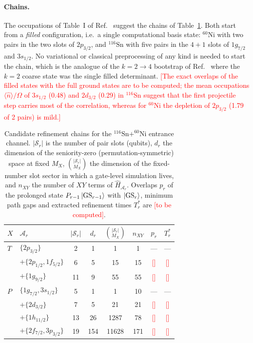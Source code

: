 \documentclass[
  aps,
  prc,
  reprint,
  superscriptaddress,
  floatfix,
  nofootinbib
]{revtex4-2}
\newcommand{\todo}[1]{\textcolor{red}{[#1]}}
\newcommand{\Sn}{^{116}\mathrm{Sn}}
\newcommand{\Ni}{^{60}\mathrm{Ni}}
\begin{document}
\paragraph{Chains.}
The occupations of Table~I of Ref.~\cite{TwoFragment2026} suggest the chains
of Table~\ref{tab:chains}.  Both start from a \emph{filled} configuration,
i.e.\ a single computational basis state: $\Ni$ with two pairs in the two
slots of $2p_{3/2}$, and $\Sn$ with five pairs in the $4+1$ slots of
$1g_{7/2}$ and $3s_{1/2}$.  No variational or classical preprocessing of any
kind is needed to start the chain, which is the analogue of the
$k=2\to4$ bootstrap of Ref.~\cite{EigenQPairing2026} where the $k=2$ coarse
state was the single filled determinant.  \todo{The exact overlaps of the
filled states with the full ground states are to be computed; the mean
occupations $\langle\hat n\rangle/\Omega$ of $3s_{1/2}$ (0.48) and
$2d_{3/2}$ (0.29) in $\Sn$ suggest that the first projectile step carries
most of the correlation, whereas for $\Ni$ the depletion of $2p_{3/2}$
(1.79 of 2 pairs) is mild.}

\begin{table}[t]
  \caption{Candidate refinement chains for the $\Sn+\Ni$ entrance channel.
  $|\mathcal S_r|$ is the number of pair slots (qubits), $d_r$ the dimension
  of the seniority-zero (permutation-symmetric) space at fixed $M_X$,
  $\binom{|\mathcal S_r|}{M_X}$ the dimension of the fixed-number slot
  sector in which a gate-level simulation lives, and $n_{XY}$ the number of
  $XY$ terms of $\hat H_{\mathcal A_r}$.  Overlaps $p_r$ of the prolonged
  state $P_{r-1}\ket{\mathrm{GS}_{r-1}}$ with $\ket{\mathrm{GS}_r}$, minimum
  path gaps and extracted refinement times $T^*_r$ are \todo{to be
  computed}.}
  \label{tab:chains}
  \begin{ruledtabular}
  \begin{tabular}{llcccccc}
  $X$ & $\mathcal A_r$ & $|\mathcal S_r|$ & $d_r$ & $\binom{|\mathcal S_r|}{M_X}$ & $n_{XY}$ & $p_r$ & $T^*_r$\\
  \hline
  $T$ & $\{2p_{3/2}\}$                      & 2  & 1   & 1     & 1   & --- & --- \\
      & $+\{2p_{1/2},1f_{5/2}\}$            & 6  & 5   & 15    & 15  & \todo{} & \todo{} \\
      & $+\{1g_{9/2}\}$                     & 11 & 9   & 55    & 55  & \todo{} & \todo{} \\
  \hline
  $P$ & $\{1g_{7/2},3s_{1/2}\}$             & 5  & 1   & 1     & 10  & --- & --- \\
      & $+\{2d_{3/2}\}$                     & 7  & 5   & 21    & 21  & \todo{} & \todo{} \\
      & $+\{1h_{11/2}\}$                    & 13 & 26  & 1287  & 78  & \todo{} & \todo{} \\
      & $+\{2f_{7/2},3p_{3/2}\}$            & 19 & 154 & 11628 & 171 & \todo{} & \todo{} \\
  \end{tabular}
  \end{ruledtabular}
\end{table}
\end{document}
